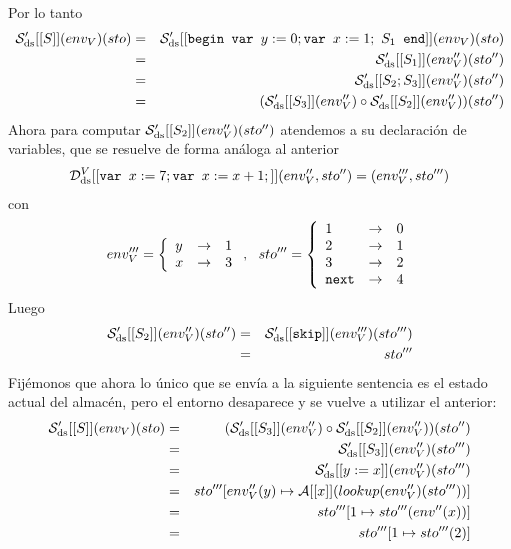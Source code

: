 \begin{example}
\[\]
Por lo tanto
\begin{eqnarray*}
    \mathcal{S}'_{\mathrm{ds}} [[S]](env_V)(sto) &=& \mathcal{S}'_{\mathrm{ds}} [[\texttt{begin } \texttt{var } y:=0; \texttt{var } x:=1;\ S_1 \texttt{ end}]](env_V)(sto) \\
    &=& \mathcal{S}'_{\mathrm{ds}}[[S_1]](env_V'')(sto'') \\
    &=& \mathcal{S}'_{\mathrm{ds}}[[S_2; S_3]](env_V'')(sto'') \\
    &=& (\mathcal{S}'_{\mathrm{ds}}[[S_3]](env_V'') \circ \mathcal{S}'_{\mathrm{ds}}[[S_2]](env_V'')) (sto'')
\end{eqnarray*}
Ahora para computar $\mathcal{S}'_{\mathrm{ds}}[[S_2]](env_V'') (sto'')$ atendemos a su declaración de variables, que se resuelve de forma análoga al anterior
\begin{eqnarray*}
    \mathcal{D}_{\mathrm{ds}}^V [[\texttt{var } x:=7; \texttt{var } x:=x+1;]](env_V'', sto'') = (env_V''', sto''')
\end{eqnarray*}
con
\[
    env_V''' = \left\{\begin{array}{lcl}
         y & \to & 1 \\
         x & \to & 3
    \end{array}\right.,\ \ sto''' = \left\{\begin{array}{lcl}
         1 & \to & 0 \\
         2 & \to & 1 \\
         3 & \to & 2 \\
         \texttt{next} & \to & 4
    \end{array}\right.
\]
Luego
\begin{eqnarray*}
    \mathcal{S}'_{\mathrm{ds}}[[S_2]](env_V'') (sto'') &=& \mathcal{S}'_{\mathrm{ds}}[[\texttt{skip}]](env_V''') (sto''') \\
    &=& sto'''
\end{eqnarray*}
Fijémonos que ahora lo único que se envía a la siguiente sentencia es el estado actual del almacén, pero el entorno desaparece y se vuelve a utilizar el anterior:
\begin{eqnarray*}
    \mc{S}'_\nn{ds} [[S]](env_V)(sto)
    &=& (\mc{S}'_\nn{ds}[[S_3]](env_V'') \circ \mc{S}'_\nn{ds}[[S_2]](env_V'')) (sto'') \\
    &=& \mc{S}'_\nn{ds}[[S_3]](env_V'')(sto''') \\
    &=& \mc{S}'_\nn{ds}[[y:=x]](env_V'')(sto''') \\
    &=& sto'''[env_V''(y) \mapsto \mathcal{A}[[x]](lookup(env_V'')(sto'''))]\\
    &=& sto'''[1 \mapsto sto'''(env''(x))] \\
    &=& sto'''[1 \mapsto sto'''(2)] \\

\end{eqnarray*}
\end{example}
